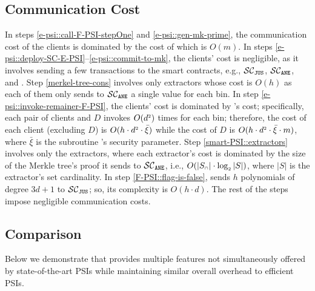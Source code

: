 

\vspace{-3.3mm}
\subsection{Communication Cost}

\vspace{-1mm}

In steps  \ref{e-psi::call-F-PSI-stepOne} and \ref{e-psi::gen-mk-prime}, the communication cost of the clients is dominated by the cost of \ct which is $O(m)$. In steps \ref{e-psi::deploy-SC-E-PSI}--\ref{e-psi::commit-to-mk}, the clients' cost is negligible, as it involves sending a few transactions to the smart contracts, e.g., $\mathcal{SC}_{\mathtt{JUS}}$, $\mathcal{SC}_{\mathtt{ANE}}$, and \SCpc. Step \ref{merkel-tree-cons} involves only extractors whose cost is $O(h)$ as each of them only sends to $\mathcal{SC}_{\mathtt{ANE}}$  a single value for each bin. In step \ref{e-psi::invoke-remainer-F-PSI}, the clients' cost is dominated by \vopr's cost; specifically, each pair of clients and $D$ invokes \vopr $O(d^{\scriptscriptstyle 2})$ times for each bin; therefore, the cost of each client (excluding $D$) is $O(h\cdot d^{\scriptscriptstyle 2}\cdot \bar\xi)$ while the cost of $D$ is $O(h\cdot d^{\scriptscriptstyle 2}\cdot \bar\xi\cdot m)$, where $\bar\xi$ is the subroutine \ole's security parameter. 
%
Step \ref{smart-PSI::extractors}  involves only the extractors, where each extractor's cost is dominated by the size of the Merkle tree's proof it sends to $\mathcal{SC}_{\mathtt{ANE}}$, i.e., $O(|S_{\scriptscriptstyle\cap}|\cdot \log_{\scriptscriptstyle 2}|S|)$, where $|S|$ is the extractor's set cardinality. 
%
In step \ref{F-PSI::flag-is-false}, \aud sends $h$ polynomials of degree $3d+1$ to $\mathcal{SC}_{\mathtt{JUS}}$; so, its complexity is $O(h\cdot d)$. 
%
The rest of the steps impose negligible communication costs. 

\vspace{-3.5mm}
\subsection{Comparison}
\vspace{-1mm}


Below we demonstrate that \epsi provides multiple features not simultaneously offered by state-of-the-art PSIs while maintaining similar overall overhead to efficient PSIs.

\vspace{-3mm}
